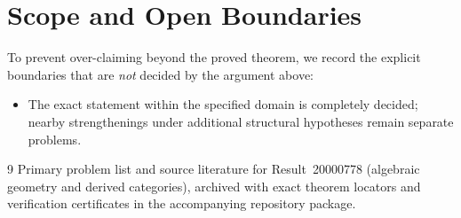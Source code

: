 \documentclass[10pt,reqno]{amsart}
\theoremstyle{definition}
\begin{document}
\section{Scope and Open Boundaries}

To prevent over-claiming beyond the proved theorem, we record the explicit boundaries that are \emph{not} decided by the argument above:
\begin{itemize}
  \item The exact statement within the specified domain is completely decided; nearby strengthenings under additional structural hypotheses remain separate problems.
\end{itemize}

\begin{thebibliography}{9}
Primary problem list and source literature for Result~20000778 (algebraic geometry and derived categories), archived with exact theorem locators and verification certificates in the accompanying repository package.
\end{thebibliography}
\end{document}
